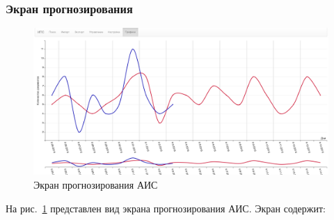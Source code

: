 \clearpage
\subsubsection{Экран прогнозирования} 

\begin{figure}[h!]
\centering
\includegraphics[width=0.9\linewidth]{technology/gui_predict1}
\caption{Экран прогнозирования АИС}
\label{figure:guiPredict}
\end{figure}

На рис.~\ref{figure:guiPredict} представлен вид экрана прогнозирования АИС. Экран содержит:
\begin{itemize}

\end{itemize}
